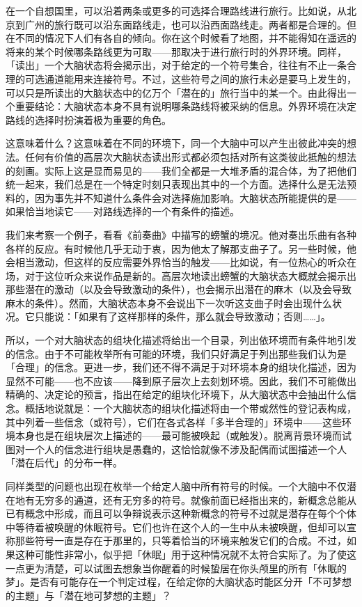 \documentclass[
  12pt,
  twoside,
  openright,
  oldfontcommands,
]{memoir}
\begin{document}
在一个自想国里，可以沿着两条或更多的可选择合理路线进行旅行。比如说，从北京到广州的旅行既可以沿东面路线走，也可以沿西面路线走。两者都是合理的。但在不同的情况下人们有各自的倾向。你在这个时候看了地图，并不能得知在遥远的将来的某个时候哪条路线更为可取------那取决于进行旅行时的外界环境。同样，「读出」一个大脑状态将会揭示出，对于给定的一个符号集合，往往有不止一条合理的可选通道能用来连接符号。不过，这些符号之间的旅行未必是要马上发生的，可以只是所读出的大脑状态中的亿万个「潜在的」旅行当中的某一个。由此得出一个重要结论：大脑状态本身不具有说明哪条路线将被采纳的信息。外界环境在决定路线的选择时扮演着极为重要的角色。

这意味着什么？这意味着在不同的环境下，同一个大脑中可以产生出彼此冲突的想法。任何有价值的高层次大脑状态读出形式都必须包括对所有这类彼此抵触的想法的刻画。实际上这是显而易见的------我们全都是一大堆矛盾的混合体，为了把他们统一起来，我们总是在一个特定时刻只表现出其中的一个方面。选择什么是无法预料的，因为事先并不知道什么条件会对选择施加影响。大脑状态所能提供的是------如果恰当地读它------对路线选择的一个有条件的描述。

我们来考察一个例子，看看《前奏曲》中描写的螃蟹的境况。他对奏出乐曲有各种各样的反应。有时候他几乎无动于衷，因为他太了解那支曲子了。另一些时候，他会相当激动，但这样的反应需要外界恰当的触发------比如说，有一位热心的听众在场，对于这位听众来说作品是新的。高层次地读出螃蟹的大脑状态大概就会揭示出那些潜在的激动（以及会导致激动的条件），也会揭示出潜在的麻木（以及会导致麻木的条件）。然而，大脑状态本身不会说出下一次听这支曲子时会出现什么状况。它只能说：「如果有了这样那样的条件，那么就会导致激动；否则\ldots\ldots」。

所以，一个对大脑状态的组块化描述将给出一个目录，列出依环境而有条件地引发的信念。由于不可能枚举所有可能的环境，我们只好满足于列出那些我们认为是「合理」的信念。更进一步，我们还不得不满足于对环境本身的组块化描述，因为显然不可能------也不应该------降到原子层次上去刻划环境。因此，我们不可能做出精确的、决定论的预言，指出在给定的组块化环境下，从大脑状态中会抽出什么信念。概括地说就是：一个大脑状态的组块化描述将由一个带或然性的登记表构成，其中列着一些信念（或符号），它们在各式各样「多半合理的」环境中------这些环境本身也是在组块层次上描述的------最可能被唤起（或触发）。脱离背景环境而试图对一个人的信念进行组块是愚蠢的，这恰恰就像不涉及配偶而试图描述一个人「潜在后代」的分布一样。

同样类型的问题也出现在枚举一个给定人脑中所有符号的时候。一个大脑中不仅潜在地有无穷多的通道，还有无穷多的符号。就像前面已经指出来的，新概念总能从已有概念中形成，而且可以争辩说表示这种新概念的符号不过就是潜存在每个个体中等待着被唤醒的休眠符号。它们也许在这个人的一生中从未被唤醒，但却可以宣称那些符号一直是存在于那里的，只等着恰当的环境来触发它们的合成。不过，如果这种可能性非常小，似乎把「休眠」用于这种情况就不太符合实际了。为了使这一点更为清楚，可以试图去想象当你醒着的时候蛰居在你头颅里的所有「休眠的梦」。是否有可能存在一个判定过程，在给定你的大脑状态时能区分开「不可梦想的主题」与「潜在地可梦想的主题」？
\end{document}
